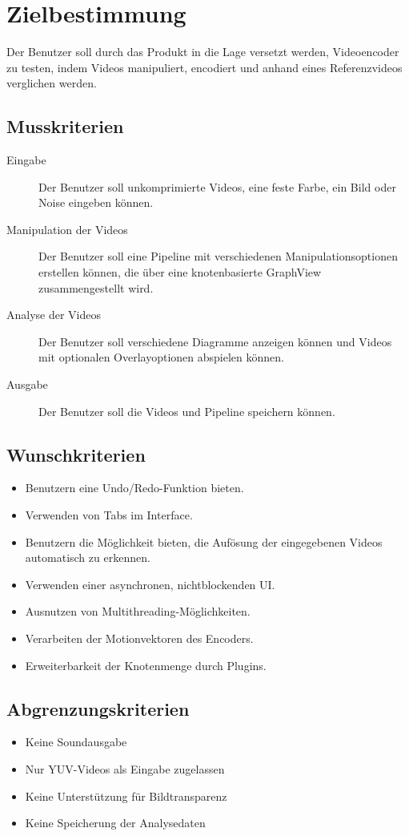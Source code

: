 \section{Zielbestimmung}

Der Benutzer soll durch das Produkt in die Lage versetzt werden, Videoencoder zu testen, indem Videos manipuliert, encodiert und anhand eines Referenzvideos verglichen werden.

\subsection{Musskriterien}

\begin{description}
	\item[Eingabe] Der Benutzer soll unkomprimierte Videos, eine feste Farbe, ein Bild oder Noise eingeben können.
	\item[Manipulation der Videos] Der Benutzer soll eine Pipeline mit verschiedenen Manipulationsoptionen erstellen können, die über eine knotenbasierte GraphView zusammengestellt wird.
	\item[Analyse der Videos] Der Benutzer soll verschiedene Diagramme anzeigen können und Videos mit optionalen Overlayoptionen abspielen können.
	\item[Ausgabe] Der Benutzer soll die Videos und Pipeline speichern können.
\end{description}

\subsection{Wunschkriterien}

\begin{itemize}
	\item Benutzern eine Undo/Redo-Funktion bieten.
	\item Verwenden von Tabs im Interface.
	\item Benutzern die Möglichkeit bieten, die Aufösung der eingegebenen Videos automatisch zu erkennen.
	\item Verwenden einer asynchronen, nichtblockenden UI.
	\item Ausnutzen von Multithreading-Möglichkeiten.
	\item Verarbeiten der Motionvektoren des Encoders.
	\item Erweiterbarkeit der Knotenmenge durch Plugins.
\end{itemize}

\subsection{Abgrenzungskriterien}

\begin{itemize}
	\item Keine Soundausgabe
	\item Nur YUV-Videos als Eingabe zugelassen
    \item Keine Unterstützung für Bildtransparenz
	\item Keine Speicherung der Analysedaten
\end{itemize}

